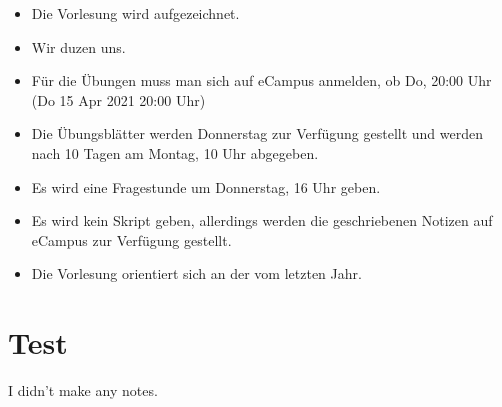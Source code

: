 \begin{orga}
    \begin{itemize}
        \item    Die Vorlesung wird aufgezeichnet.
        \item Wir duzen uns.
        \item Für die Übungen muss man sich auf eCampus anmelden, ob Do, 20:00 Uhr (Do 15 Apr 2021 20:00 Uhr)
        \item Die Übungsblätter werden Donnerstag zur Verfügung gestellt und werden nach 10 Tagen am Montag, 10 Uhr abgegeben.
        \item Es wird eine Fragestunde um Donnerstag, 16 Uhr geben.
        \item Es wird kein Skript geben, allerdings werden die geschriebenen Notizen auf eCampus zur Verfügung gestellt.
        \item Die Vorlesung orientiert sich an der vom letzten Jahr.
    \end{itemize}
\end{orga}

\section{Test}
I didn't make any notes.








